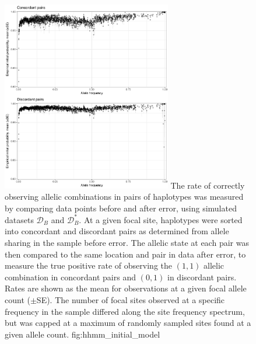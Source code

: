 

\begin{figure}[!htb]
\centering
\includegraphics[width=0.66\textwidth]{./img/ch5/hhmm_initial_model_lowres}
{The rate of correctly observing allelic combinations in pairs of haplotypes was measured by comparing data points before and after error, using simulated datasets $\mathcal{D}_B$ and $\mathcal{D}_B^{\ast}$.
At a given focal site, haplotypes were sorted into concordant and discordant pairs as determined from allele sharing in the sample before error.
The allelic state at each pair was then compared to the same location and pair in data after error, to measure the true positive rate of observing the $(1,1)$ allelic combination in concordant pairs and $(0,1)$ in discordant pairs.
Rates are shown as the mean for observations at a given focal allele count ($\pm$SE).
The number of focal sites observed at a specific frequency in the sample differed along the site frequency spectrum, but was capped at a maximum of  randomly sampled sites found at a given allele count.}
{fig:hhmm_initial_model}
\end{figure}

